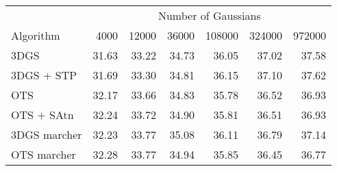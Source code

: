 \begin{tabular}{lrrrrrr}
\toprule
& \multicolumn{6}{c}{Number of Gaussians} \\
Algorithm & 4000 & 12000 & 36000 & 108000 & 324000 & 972000 \\

\midrule
3DGS & 31.63 & 33.22 & 34.73 & 36.05 & 37.02 & 37.58 \\
3DGS + STP & 31.69 & 33.30 & 34.81 & 36.15 & 37.10 & 37.62 \\
OTS & 32.17 & 33.66 & 34.83 & 35.78 & 36.52 & 36.93 \\
OTS + SAtn & 32.24 & 33.72 & 34.90 & 35.81 & 36.51 & 36.93 \\
3DGS marcher & 32.23 & 33.77 & 35.08 & 36.11 & 36.79 & 37.14 \\
OTS marcher & 32.28 & 33.77 & 34.94 & 35.85 & 36.45 & 36.77 \\
\bottomrule
\end{tabular}
